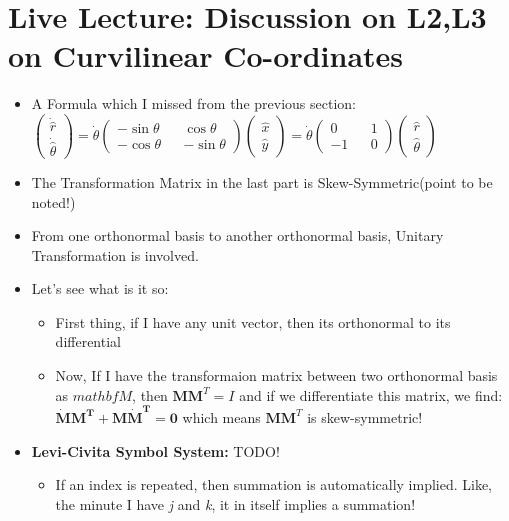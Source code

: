 \documentclass{article}
\begin{document}
\section{Live Lecture: Discussion on L2,L3 on Curvilinear Co-ordinates}
\begin{itemize}
  \item A Formula which I missed from the previous  section: \\
  $\begin{pmatrix}
    \dot{\hat{r}} \\
    \dot{\hat{\theta}}
  \end{pmatrix}
 = \dot{\theta}
 \begin{pmatrix}
  -\sin \theta && \cos \theta \\
  -\cos \theta && - \sin \theta
 \end{pmatrix}
 \begin{pmatrix}
   {\hat{x}} \\
   {\hat{y}}
 \end{pmatrix}
 = \dot{\theta}
 \begin{pmatrix}
   0 && 1 \\
   -1 && 0
 \end{pmatrix}
 \begin{pmatrix}
   \hat{r} \\
   \hat{\theta}
 \end{pmatrix}
  $

  \item The Transformation Matrix in the last part is Skew-Symmetric(point to be noted!)
  \item From one orthonormal basis to another orthonormal basis, Unitary Transformation is involved.
  \item Let's see what is it so:
    \begin{itemize}
      \item First thing, if I have any unit vector, then its orthonormal to its differential
      \item Now, If I have the transformaion matrix between two orthonormal basis as $mathbf{M}$, then $\mathbf{MM}^{T} = I$ and if we differentiate this matrix, we find:
      $\mathbf{\dot{M}M^T + M\dot{M}^T = 0}$ which means $\mathbf{MM}^{T}$ is skew-symmetric!
    \end{itemize}
  \item \textbf{Levi-Civita Symbol System:} TODO!
  \begin{itemize}
    \item If an index is repeated, then summation is automatically implied.
    Like, the minute I have \textit{j} and \textit{k}, it in itself implies a summation!
  \end{itemize}

\end{itemize}
\end{document}
